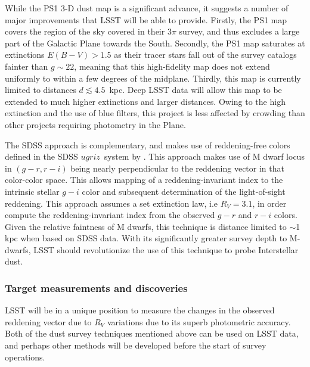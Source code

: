 While the PS1 3-D dust map is a significant advance, it suggests a
number of major improvements that LSST will be able to
provide. Firstly, the PS1 map covers the region of the sky covered in
their 3$\pi$ survey, and thus excludes a large part of the Galactic
Plane towards the South. Secondly, the PS1 map \citep{2014ApJ...789...15S}
saturates at extinctions $E(B-V) > 1.5$ as their tracer stars fall out
of the survey catalogs fainter than $g\sim 22$, meaning that this
high-fidelity map does not extend uniformly to within a few degrees of
the midplane. Thirdly, this map is currently limited to distances $d
\lesssim 4.5$~kpc. Deep LSST data will allow this map to be extended
to much higher extinctions and larger distances. Owing to the high
extinction and the use of blue filters, this project is less affected
by crowding than other projects requiring photometry in the Plane.

The SDSS approach is complementary, and makes use of reddening-free
colors defined in the SDSS $ugriz$~system by \citet{mcgehee05}.
This approach makes use of M dwarf locus in $(g-r,r-i)$
being nearly perpendicular to the reddening vector in that color-color
space. This allows mapping of a reddening-invariant index to the
intrinsic stellar $g-i$ color and subsequent determination of the
light-of-sight reddening. This approach assumes a set extinction law,
i.e $R_V = 3.1$, in order compute the reddening-invariant index from
the observed $g-r$ and $r-i$ colors. Given the relative faintness of M
dwarfs, this technique is distance limited to $\sim$1 kpc when based
on SDSS data. With its significantly greater survey depth to M-dwarfs,
LSST should revolutionize the use of this technique to probe
Interstellar dust.


\subsubsection{Target measurements and discoveries}
\label{sec:\secname:targets}

LSST will be in a unique position to measure the changes in the
observed reddening vector due to $R_V$ variations due to its superb
photometric accuracy.  Both of the dust survey techniques mentioned
above can be used on LSST data, and perhaps other methods will be
developed before the start of survey operations.

